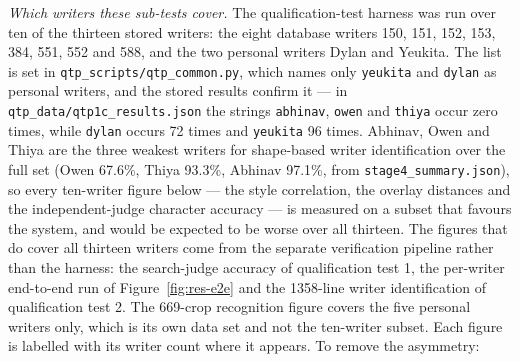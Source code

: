 \emph{Which writers these sub-tests cover.}
The qualification-test harness was run over ten of the thirteen stored writers: the eight database writers 150, 151, 152, 153, 384, 551, 552 and 588, and the two personal writers Dylan and Yeukita.
The list is set in \texttt{qtp\_scripts/qtp\_common.py}, which names only \texttt{yeukita} and \texttt{dylan} as personal writers, and the stored results confirm it --- in \texttt{qtp\_data/qtp1c\_results.json} the strings \texttt{abhinav}, \texttt{owen} and \texttt{thiya} occur zero times, while \texttt{dylan} occurs 72 times and \texttt{yeukita} 96 times.
Abhinav, Owen and Thiya are the three weakest writers for shape-based writer identification over the full set (Owen 67.6\%, Thiya 93.3\%, Abhinav 97.1\%, from \texttt{stage4\_summary.json}), so every ten-writer figure below --- the style correlation, the overlay distances and the independent-judge character accuracy --- is measured on a subset that favours the system, and would be expected to be worse over all thirteen.
The figures that do cover all thirteen writers come from the separate verification pipeline rather than the harness: the search-judge accuracy of qualification test 1, the per-writer end-to-end run of Figure~\ref{fig:res-e2e} and the 1358-line writer identification of qualification test 2. The 669-crop recognition figure covers the five personal writers only, which is its own data set and not the ten-writer subset. Each figure is labelled with its writer count where it appears.
To remove the asymmetry: 

